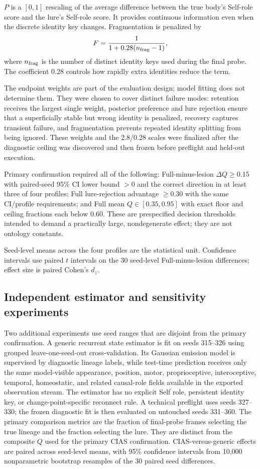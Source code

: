 \documentclass[journal]{IEEEtran}
\begin{document}
$P$ is a $[0,1]$ rescaling of the average difference between the true body's Self-role score and the lure's Self-role score. It provides continuous information even when the discrete identity key changes. Fragmentation is penalized by
\begin{equation}
F=\frac{1}{1+0.28(n_{\rm frag}-1)},
\label{eq:fragment}
\end{equation}
where $n_{\rm frag}$ is the number of distinct identity keys used during the final probe. The coefficient 0.28 controls how rapidly extra identities reduce the term.

The endpoint weights are part of the evaluation design; model fitting does not determine them. They were chosen to cover distinct failure modes: retention receives the largest single weight, posterior preference and lure rejection ensure that a superficially stable but wrong identity is penalized, recovery captures transient failure, and fragmentation prevents repeated identity splitting from being ignored. These weights and the 2.8/0.28 scales were finalized after the diagnostic ceiling was discovered and then frozen before preflight and held-out execution.

Primary confirmation required all of the following: Full-minus-lesion $\Delta Q\ge0.15$ with paired-seed 95\% CI lower bound $>0$ and the correct direction in at least three of four profiles; Full lure-rejection advantage $\ge0.30$ with the same CI/profile requirements; and Full mean $Q\in[0.35,0.95]$ with exact floor and ceiling fractions each below 0.60. These are prespecified decision thresholds intended to demand a practically large, nondegenerate effect; they are not ontology constants.

Seed-level means across the four profiles are the statistical unit. Confidence intervals use paired $t$ intervals on the 30 seed-level Full-minus-lesion differences; effect size is paired Cohen's $d_z$.

\subsection{Independent estimator and sensitivity experiments}
Two additional experiments use seed ranges that are disjoint from the primary confirmation. A generic recurrent state estimator is fit on seeds 315--326 using grouped leave-one-seed-out cross-validation. Its Gaussian emission model is supervised by diagnostic lineage labels, while test-time prediction receives only the same model-visible appearance, position, motor, proprioceptive, interoceptive, temporal, homeostatic, and related causal-role fields available in the exported observation stream. The estimator has no explicit Self role, persistent identity key, or change-point-specific reconnect rule. A technical preflight uses seeds 327--330; the frozen diagnostic fit is then evaluated on untouched seeds 331--360. The primary comparison metrics are the fraction of final-probe frames selecting the true lineage and the fraction selecting the lure. They are distinct from the composite $Q$ used for the primary CIAS confirmation. CIAS-versus-generic effects are paired across seed-level means, with 95\% confidence intervals from 10,000 nonparametric bootstrap resamples of the 30 paired seed differences.
\end{document}
